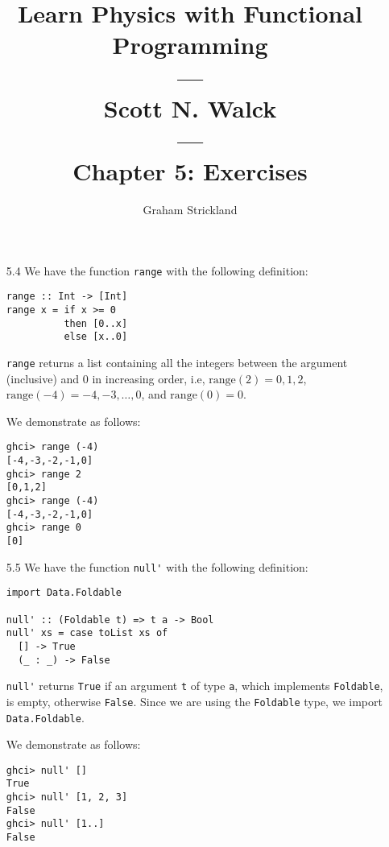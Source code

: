 \documentclass{article}
\title{
    Learn Physics with Functional Programming\\---\\Scott N. Walck\\---\\
    Chapter 5: Exercises
}
\author{Graham Strickland}
\begin{document}
\maketitle  

    \begin{itemize}
        \item[5.4] We have the function \verb|range| with the following definition:
        \begin{verbatim}
range :: Int -> [Int]
range x = if x >= 0
          then [0..x]
          else [x..0]
        \end{verbatim}
        \verb|range| returns a list containing all the integers between the argument 
        (inclusive) and 0 in increasing order, i.e, $\text{range}(2) = 0, 1, 2$, 
        $\text{range}(-4) = -4, -3, \ldots, 0$, and $\text{range}(0) = 0$.\par
        \qquad We demonstrate as follows:
        \begin{verbatim}
ghci> range (-4)
[-4,-3,-2,-1,0]
ghci> range 2
[0,1,2]
ghci> range (-4)
[-4,-3,-2,-1,0]
ghci> range 0
[0]
        \end{verbatim}
        \item[5.5] We have the function \verb|null'| with the following definition:
        \begin{verbatim}
import Data.Foldable

null' :: (Foldable t) => t a -> Bool
null' xs = case toList xs of
  [] -> True
  (_ : _) -> False
        \end{verbatim}
        \verb|null'| returns \verb|True| if an argument \verb|t| of type \verb|a|, 
        which implements \verb|Foldable|, is empty, otherwise \verb|False|. Since we 
        are using the \verb|Foldable| type, we import \verb|Data.Foldable|.\par
        \qquad We demonstrate as follows:
        \begin{verbatim}
ghci> null' []
True
ghci> null' [1, 2, 3]
False
ghci> null' [1..]
False
        \end{verbatim}
    \end{itemize}
\end{document}
